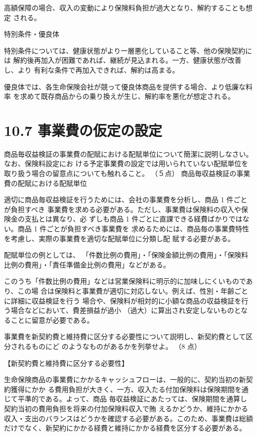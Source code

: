 \documentclass[report,gutter=10mm,fore-edge=10mm,uplatex,dvipdfmx]{jlreq}
\begin{document}
高額保障の場合、収入の変動により保険料負担が過大となり、解約することも想定
される。

特別条件・優良体

特別条件については、健康状態がより一層悪化していること等、他の保険契約には
解約後再加入が困難であれば、継続が見込まれる。一方、健康状態が改善し、より
有利な条件で再加入できれば、解約は高まる。

優良体では、各生命保険会社が競って優良体商品を提供する場合、より低廉な料率
を求めて既存商品からの乗り換えが生じ、解約率を悪化が想定される。

\section{10.7 事業費の仮定の設定}

商品毎収益検証の事業費の配賦における配賦単位について簡潔に説明しなさい。なお、保険料設定にお
ける予定事業費の設定では用いられていない配賦単位を取り扱う場合の留意点についても触れること。
（５点）
\answer{}
商品毎収益検証の事業費の配賦における配賦単位

 適切に商品毎収益検証を行うためには、会社の事業費を分析し、商品 1 件ごとが負担すべき
事業費を求める必要がある。ただし、事業費は保険料の収入や保険金の支払とは異なり、必
ずしも商品 1 件ごとに直課できる経費ばかりではない。商品 1 件ごとが負担すべき事業費を
求めるためには、商品毎の事業費特性を考慮し、実際の事業費を適切な配賦単位に分類し配
賦する必要がある。

 配賦単位の例としては、
「件数比例の費用」・「保険金額比例の費用」・「保険料比例の費用」・「責任準備金比例の費用」などがある。

 このうち「件数比例の費用」などは営業保険料に明示的に加味しにくいものであり、この場
合は保険料と事業費が適切に対応しない。例えば、性別・年齢ごとに詳細に収益検証を行う
場合や、保険料が相対的に小額な商品の収益検証を行う場合などにおいて、費差損益が過小
（過大）に算出され安定しないものとなることに留意が必要である。

事業費を新契約費と維持費に区分する必要性について説明し、新契約費として区分されるものにど
のようなものがあるかを列挙せよ。
（8 点）

\answer{}
【新契約費と維持費に区分する必要性】

生命保険商品の事業費にかかるキャッシュフローは、一般的に、契約当初の新契約獲得にかか
る費用負担が大きく、一方、収入たる付加保険料は保険期間を通じて平準的である。よって、商品
毎収益検証にあたっては、保険期間を通算し契約当初の費用負担を将来の付加保険料収入で賄
えるかどうか、維持にかかる収入・支出のバランスはどうかを確認する必要がある。このため、事業費は総額だけでなく、新契約にかかる経費と維持にかかる経費を区分する必要がある。
\end{document}
